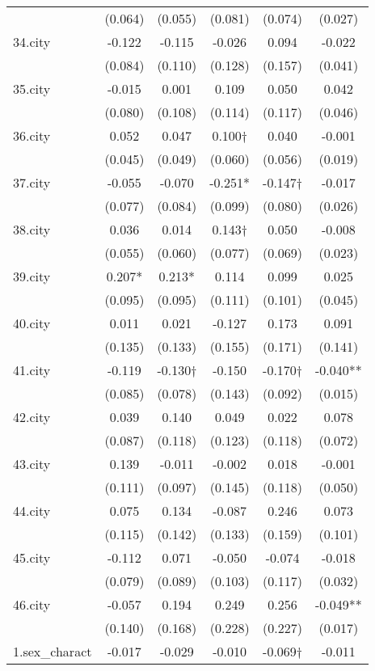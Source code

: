 \documentclass[]{article}
\begin{document}
\begin{tabular}{lccccc}
 & (0.064) & (0.055) & (0.081) & (0.074) & (0.027) \\
34.city & -0.122 & -0.115 & -0.026 & 0.094 & -0.022 \\
 & (0.084) & (0.110) & (0.128) & (0.157) & (0.041) \\
35.city & -0.015 & 0.001 & 0.109 & 0.050 & 0.042 \\
 & (0.080) & (0.108) & (0.114) & (0.117) & (0.046) \\
36.city & 0.052 & 0.047 & 0.100† & 0.040 & -0.001 \\
 & (0.045) & (0.049) & (0.060) & (0.056) & (0.019) \\
37.city & -0.055 & -0.070 & -0.251* & -0.147† & -0.017 \\
 & (0.077) & (0.084) & (0.099) & (0.080) & (0.026) \\
38.city & 0.036 & 0.014 & 0.143† & 0.050 & -0.008 \\
 & (0.055) & (0.060) & (0.077) & (0.069) & (0.023) \\
39.city & 0.207* & 0.213* & 0.114 & 0.099 & 0.025 \\
 & (0.095) & (0.095) & (0.111) & (0.101) & (0.045) \\
40.city & 0.011 & 0.021 & -0.127 & 0.173 & 0.091 \\
 & (0.135) & (0.133) & (0.155) & (0.171) & (0.141) \\
41.city & -0.119 & -0.130† & -0.150 & -0.170† & -0.040** \\
 & (0.085) & (0.078) & (0.143) & (0.092) & (0.015) \\
42.city & 0.039 & 0.140 & 0.049 & 0.022 & 0.078 \\
 & (0.087) & (0.118) & (0.123) & (0.118) & (0.072) \\
43.city & 0.139 & -0.011 & -0.002 & 0.018 & -0.001 \\
 & (0.111) & (0.097) & (0.145) & (0.118) & (0.050) \\
44.city & 0.075 & 0.134 & -0.087 & 0.246 & 0.073 \\
 & (0.115) & (0.142) & (0.133) & (0.159) & (0.101) \\
45.city & -0.112 & 0.071 & -0.050 & -0.074 & -0.018 \\
 & (0.079) & (0.089) & (0.103) & (0.117) & (0.032) \\
46.city & -0.057 & 0.194 & 0.249 & 0.256 & -0.049** \\
 & (0.140) & (0.168) & (0.228) & (0.227) & (0.017) \\
1.sex\_charact & -0.017 & -0.029 & -0.010 & -0.069† & -0.011 \\

\end{tabular}
\end{document}
